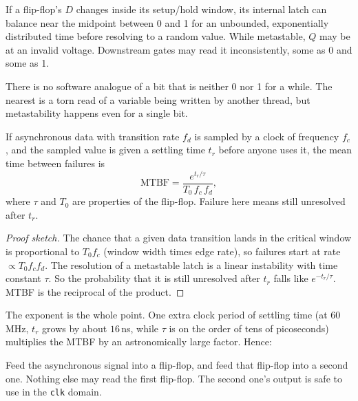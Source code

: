 \begin{definition}[Metastability]
If a flip-flop's $D$ changes inside its setup/hold window, its internal
latch can balance near the midpoint between 0 and 1 for an unbounded,
exponentially distributed time before resolving to a random value. While
metastable, $Q$ may be at an invalid voltage. Downstream gates may read it
inconsistently, some as 0 and some as 1.
\end{definition}

There is no software analogue of a bit that is neither 0 nor 1 for a while.
The nearest is a torn read of a variable being written by another thread,
but metastability happens even for a single bit.

\begin{proposition}
If asynchronous data with transition rate $f_d$ is sampled by a clock of
frequency $f_c$, and the sampled value is given a settling time $t_r$ before
anyone uses it, the mean time between failures is
\[
  \mathrm{MTBF} = \frac{e^{t_r/\tau}}{T_0\, f_c\, f_d},
\]
where $\tau$ and $T_0$ are properties of the flip-flop. Failure here means
still unresolved after $t_r$.
\end{proposition}
\begin{proof}[Proof sketch]
The chance that a given data transition lands in the critical window is
proportional to $T_0 f_c$ (window width times edge rate), so failures start
at rate $\propto T_0 f_c f_d$. The resolution of a metastable latch is a
linear instability with time constant $\tau$. So the probability that it
is still unresolved after $t_r$ falls like $e^{-t_r/\tau}$. MTBF is the
reciprocal of the product.
\end{proof}

The exponent is the whole point. One extra clock period of settling time
(at 60\,MHz, $t_r$ grows by about $16$\,ns, while $\tau$ is on the order of
tens of picoseconds) multiplies the MTBF by an astronomically large factor.
Hence:

\begin{definition}
Feed the asynchronous signal into a flip-flop, and feed that flip-flop into a
second one. Nothing else may read the first flip-flop. The second one's
output is safe to use in the \texttt{clk} domain.
\end{definition}

